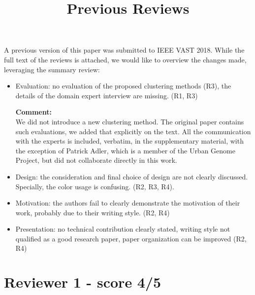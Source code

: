 \documentclass{article}
\title{Previous Reviews}
\newcommand{\reply}[1]{\begin{tcolorbox}\noindent\textbf{Comment:}\\#1\hfill\end{tcolorbox}}
\begin{document}
\maketitle
A previous version of this paper was submitted to IEEE VAST 2018. While the full
text of the reviews is attached, we would like to overview the changes made,
leveraging the summary review:


\begin{itemize}
    \item{Evaluation: no evaluation of the proposed clustering methods (R3), the details
    of the domain expert interview are missing. (R1, R3)
    
    \reply{We did not introduce a new clustering method. The original paper
    contains such evaluations, we added that explicitly on the text. All the
    communication with the experts is included, verbatim, in the supplementary
    material, with the exception of Patrick Adler, which is a member of the
    Urban Genome Project, but did not collaborate directly in this work.}}

    \item{Design: the consideration and final choice of design are not clearly discussed.
    Specially, the color usage is confusing. (R2, R3, R4).
    
    }

    \item{Motivation: the authors fail to clearly demonstrate the motivation of their
    work, probably due to their writing style. (R2, R4)}

    \item{Presentation: no technical contribution clearly stated, writing style not
    qualified as a good research paper, paper organization can be improved (R2, R4)}
\end{itemize}

\section{Reviewer 1 - score 4/5}
\end{document}
